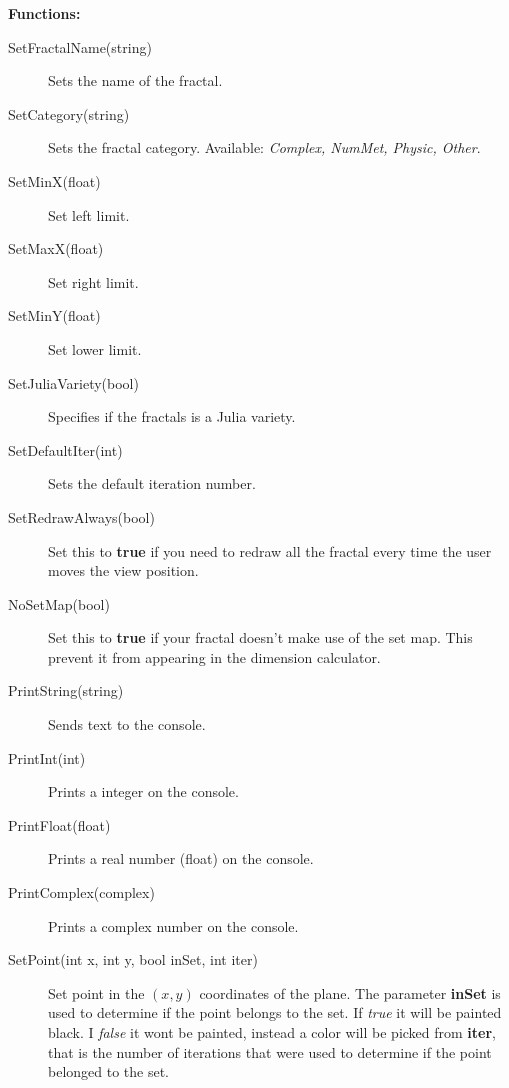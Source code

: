 \documentclass[oneside]{book}
\begin{document}
\textbf{Functions:}
\begin{description}
\item[SetFractalName(string)] Sets the name of the fractal.
\item[SetCategory(string)] Sets the fractal category. Available: \textit{Complex, NumMet, Physic, Other}.
\item[SetMinX(float)] Set left limit.
\item[SetMaxX(float)] Set right limit.
\item[SetMinY(float)] Set lower limit.
\item[SetJuliaVariety(bool)] Specifies if the fractals is a Julia variety.
\item[SetDefaultIter(int)] Sets the default iteration number.
\item[SetRedrawAlways(bool)] Set this to \textbf{true} if you need to redraw all the fractal every time the user moves the view position.
\item[NoSetMap(bool)] Set this to \textbf{true} if your fractal doesn't make use of the set map. This prevent it from appearing in the dimension calculator.
\item[PrintString(string)] Sends text to the console.
\item[PrintInt(int)] Prints a integer on the console.
\item[PrintFloat(float)] Prints a real number (float) on the console.
\item[PrintComplex(complex)] Prints a complex number on the console.
\item[SetPoint(int x, int y, bool inSet, int iter)] Set point in the  $(x,y)$ coordinates of the plane. The parameter \textbf{inSet} is used to determine if the point belongs to the set. If \textit{true} it will be painted black. I \textit{false} it wont be painted, instead a color will be picked from \textbf{iter}, that is the number of iterations that were used to determine if the point belonged to the set.
\end{description}
\end{document}
